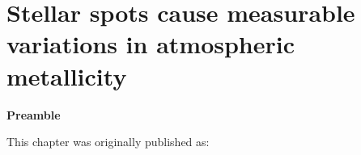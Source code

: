 
\chapter{Stellar spots cause measurable variations in atmospheric metallicity}
\label{chap:stellar_spots}

\textbf{Preamble}

This chapter was originally published as:
\begin{quote}
	\citet{tanner_ss}
\end{quote}

\newpage


